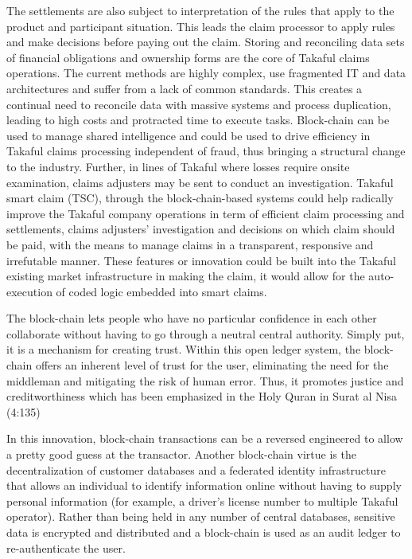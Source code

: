 \documentclass[a4paper,11pt]{article}
\begin{document}
The settlements are also subject to interpretation of the rules that apply to the product and participant situation. This leads the claim processor to apply rules and make decisions before paying out the claim. Storing and reconciling data sets of financial obligations and ownership forms are the core of Takaful claims operations. The current methods are highly complex, use fragmented IT and data architectures and suffer from a lack of common standards. This creates a continual need to reconcile data with massive systems and process duplication, leading to high costs and protracted time to execute tasks. Block-chain can be used to manage shared intelligence and could be used to drive efficiency in Takaful claims processing independent of fraud, thus bringing a structural change to the industry. 
Further, in lines of Takaful where losses require onsite examination, claims adjusters may be sent to conduct an investigation. Takaful smart claim (TSC), through the block-chain-based systems could help radically improve the Takaful company operations in term of efficient claim processing and settlements, claims adjusters' investigation and decisions on which claim should be paid, with the means to manage claims in a transparent, responsive and irrefutable manner. These features or innovation could be built into the Takaful existing market infrastructure in making the claim, it would allow for the auto-execution of coded logic embedded into smart claims.

The block-chain lets people who have no particular confidence in each other collaborate without having to go through a neutral central authority. Simply put, it is a mechanism for creating trust. Within this open ledger system, the block-chain offers an inherent level of trust for the user, eliminating the need for the middleman and mitigating the risk of human error. Thus, it promotes justice and creditworthiness which has been emphasized in the Holy Quran in Surat al Nisa (4:135)

In this innovation, block-chain transactions can be a reversed engineered to allow a pretty good guess at the transactor. Another block-chain virtue is the decentralization of customer databases and a federated identity infrastructure that allows an individual to identify information online without having to supply personal information (for example, a driver’s license number to multiple Takaful operator). Rather than being held in any number of central databases, sensitive data is encrypted and distributed and a block-chain is used as an audit ledger to re-authenticate the user. 
\end{document}
